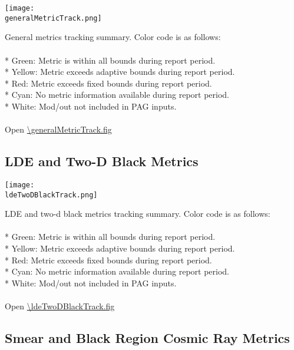 \begin{center}
\texttt{[image: \\generalMetricTrack.png]}
\end{center}
General metrics tracking summary. Color code is as follows:\\
\\
* Green: Metric is within all bounds during report period.\\
* Yellow: Metric exceeds adaptive bounds during report period.\\
* Red: Metric exceeds fixed bounds during report period.\\
* Cyan: No metric information available during report period.\\
* White: Mod/out not included in PAG inputs.\\
\\
Open \url{\generalMetricTrack.fig}

\newpage

\subsection{LDE and Two-D Black Metrics}

\begin{center}
\texttt{[image: \\ldeTwoDBlackTrack.png]}
\end{center}
LDE and two-d black metrics tracking summary. Color code is as follows:\\
\\
* Green: Metric is within all bounds during report period.\\
* Yellow: Metric exceeds adaptive bounds during report period.\\
* Red: Metric exceeds fixed bounds during report period.\\
* Cyan: No metric information available during report period.\\
* White: Mod/out not included in PAG inputs.\\
\\
Open \url{\ldeTwoDBlackTrack.fig}

\newpage

\subsection{Smear and Black Region Cosmic Ray Metrics}


